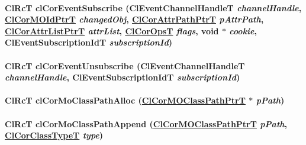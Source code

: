 \hypertarget{group__group13_ga63}{
\paragraph[clCorEventSubscribe]{\setlength{\rightskip}{0pt plus 5cm}Cl\-Rc\-T cl\-Cor\-Event\-Subscribe (Cl\-Event\-Channel\-Handle\-T {\em channel\-Handle}, \hyperlink{struct_cl_cor_m_o_id}{Cl\-Cor\-MOId\-Ptr\-T} {\em changed\-Obj}, \hyperlink{struct_cl_cor_attr_path}{Cl\-Cor\-Attr\-Path\-Ptr\-T} {\em p\-Attr\-Path}, \hyperlink{struct_cl_cor_attr_list}{Cl\-Cor\-Attr\-List\-Ptr\-T} {\em attr\-List}, \hyperlink{group__group13_ga333}{Cl\-Cor\-Ops\-T} {\em flags}, void $\ast$ {\em cookie}, Cl\-Event\-Subscription\-Id\-T {\em subscription\-Id})}\hfill}
\label{group__group13_ga63}


\hypertarget{group__group13_ga64}{
\paragraph[clCorEventUnsubscribe]{\setlength{\rightskip}{0pt plus 5cm}Cl\-Rc\-T cl\-Cor\-Event\-Unsubscribe (Cl\-Event\-Channel\-Handle\-T {\em channel\-Handle}, Cl\-Event\-Subscription\-Id\-T {\em subscription\-Id})}\hfill}
\label{group__group13_ga64}


\hypertarget{group__group13_ga96}{
\paragraph[clCorMoClassPathAlloc]{\setlength{\rightskip}{0pt plus 5cm}Cl\-Rc\-T cl\-Cor\-Mo\-Class\-Path\-Alloc (\hyperlink{struct_cl_cor_m_o_class_path}{Cl\-Cor\-MOClass\-Path\-Ptr\-T} $\ast$ {\em p\-Path})}\hfill}
\label{group__group13_ga96}


\hypertarget{group__group13_ga100}{
\paragraph[clCorMoClassPathAppend]{\setlength{\rightskip}{0pt plus 5cm}Cl\-Rc\-T cl\-Cor\-Mo\-Class\-Path\-Append (\hyperlink{struct_cl_cor_m_o_class_path}{Cl\-Cor\-MOClass\-Path\-Ptr\-T} {\em p\-Path}, \hyperlink{group__group13_ga2}{Cl\-Cor\-Class\-Type\-T} {\em type})}\hfill}
\label{group__group13_ga100}


